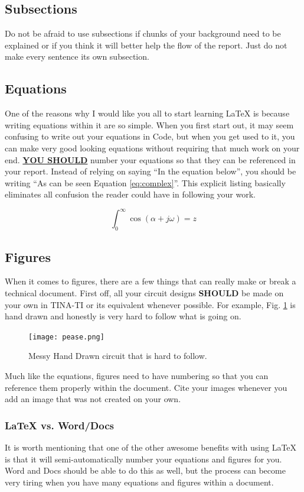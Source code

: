 \documentclass{hitec}
\begin{document}
\subsection{Subsections}
Do not be afraid to use subsections if chunks of your background need to be explained or if you think it will better help the flow of the report. Just do not make every sentence its own subsection.
\subsection{Equations}
One of the reasons why I would like you all to start learning LaTeX is because writing equations within it are so simple. When you first start out, it may seem confusing to write out your equations in Code, but when you get used to it, you can make very good looking equations without requiring that much work on your end. \textbf{\underline{YOU SHOULD}} number your equations so that they can be referenced in your report. Instead of relying on saying ``In the equation below'', you should be writing ``As can be seen Equation \ref{eq:complex}''. This explicit listing basically eliminates all confusion the reader could have in following your work.

\begin{equation}
\int_0^\infty \cos(\alpha + j\omega) = z
\label{eq:complex}
\end{equation}


\subsection{Figures}
When it comes to figures, there are a few things that can really make or break a technical document. First off, all your circuit designs \textbf{SHOULD} be made on your own in TINA-TI or its equivalent whenever possible. For example, Fig. \ref{fig:MessyCircuit} is hand drawn and honestly is very hard to follow what is going on.

\begin{figure}[h]
\centering
\texttt{[image: pease.png]}
\caption{Messy Hand Drawn circuit that is hard to follow.}
\label{fig:MessyCircuit}
\end{figure}

\noindent
Much like the equations, figures need to have numbering so that you can reference them properly within the document. Cite your images whenever you add an image that was not created on your own.

\subsubsection{\LaTeX \hspace{0ex} vs. Word/Docs}
It is worth mentioning that one of the other awesome benefits with using LaTeX is that it will semi-automatically number your equations and figures for you. Word and Docs should be able to do this as well, but the process can become very tiring when you have many equations and figures within a document.
\end{document}
